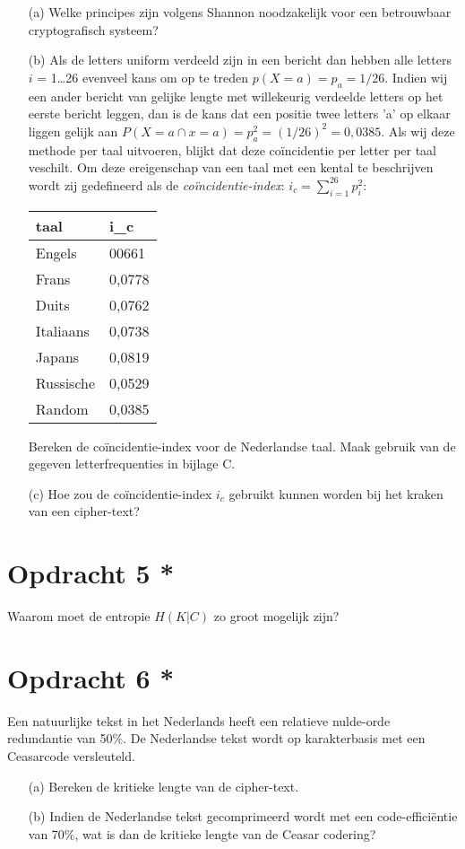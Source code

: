 \begin{itemize}
  \item[(a)] Welke principes zijn volgens Shannon noodzakelijk voor een betrouwbaar cryptografisch systeem?
  \item[(b)] Als de letters uniform verdeeld zijn in een bericht dan hebben alle letters $i$ = 1\ldots26 evenveel kans om op te treden $p(X=a)=p_a=1/26$. Indien wij een ander bericht van gelijke lengte met willekeurig verdeelde letters op het eerste bericht leggen, dan is de kans dat een positie twee letters 'a' op elkaar liggen gelijk aan $P(X=a\cap x = a)=p_a^2=(1/26)^2=0,0385$. Als wij deze methode per taal uitvoeren, blijkt dat deze co\"{i}ncidentie per letter per taal veschilt. Om deze ereigenschap van een taal met een kental te beschrijven wordt zij gedefineerd als de \emph{co\"{i}ncidentie-index}: $i_c=\sum ^{26}_{i=1} p^2_i$:

\begin{center}
\begin{tabular}{ll}
  taal & i_c \\
  \hline
  Engels & 00661 \\ 
  Frans & 0,0778 \\
  Duits & 0,0762 \\
  Italiaans & 0,0738 \\
  Japans & 0,0819 \\
  Russische & 0,0529 \\
  Random & 0,0385 \\
\end{tabular}
\end{center}

Bereken de co\"{i}ncidentie-index voor de Nederlandse taal. Maak gebruik van de gegeven letterfrequenties in bijlage C.
   \item[(c)] Hoe zou de co\"{i}ncidentie-index $i_c$ gebruikt kunnen worden bij het kraken van een cipher-text?
\end{itemize}

\section{Opdracht 5 *}
Waarom moet de entropie $H(K|C)$ zo groot mogelijk zijn?

\section{Opdracht 6 *}
Een natuurlijke tekst in het Nederlands heeft een relatieve nulde-orde redundantie van 50\%. De Nederlandse tekst wordt op karakterbasis met een Ceasarcode versleuteld.
\begin{itemize}
  \item[(a)] Bereken de kritieke lengte van de cipher-text.
  \item[(b)] Indien de Nederlandse tekst gecomprimeerd wordt met een code-effici\"{e}ntie van 70\%, wat is dan de kritieke lengte van de Ceasar codering?
\end{itemize}
